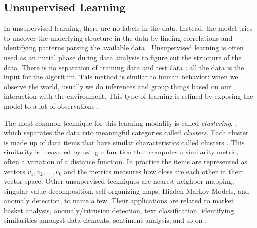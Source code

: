 \documentclass[12pt]{report}
\begin{document}
\subsection{Unsupervised Learning}
In unsupervised learning, there are no labels in the data. Instead, the model tries to uncover the underlying structure in the data by 
finding correlations and identifying patterns parsing the available data \cite{Nevala2017}. Unsupervised learning is often used as 
an initial phase during data analysis to figure out the structure of the data. 
%
%
There is no separation of training data and test data \cite{Shai2014}; all the data is the input for the algorithm. This method is similar to human behavior: when we observe the world, usually we do inferences and group things based on our interaction with the environment.
This type of learning is refined by exposing the model to  a lot of observations \cite{Nevala2017}.

The most common technique for this learning modality is called {\em clustering}, \cite{Russell2010}, which separates the data into meaningful categories called {\em clusters}. Each cluster is made up of data items that have similar characteristics called clusters \cite{Nilsson1998} \cite{Goodfellow2016}. This similarity is measured by using a function that computes a similarity metric, often a variation of a distance function. In practice the items are represented as vectors 
$v_1,  v_2, ..., v_k$ and the metrics measures how close are each other in their vector space. Other unsupervised techniques are nearest neighbor mapping, singular value decomposition,  self-organizing maps, Hidden Markov Models, and anomaly detection, to name a few. Their applications are related to market basket analysis, anomaly/intrusion detection, text classification, identifying similarities amongst data elements, sentiment analysis, and so on \cite{Nevala2017} \cite{Halibas2018}.
\end{document}
